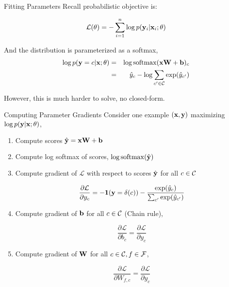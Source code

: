 \documentclass{beamer}
\begin{document}
\begin{frame}{Fitting Parameters}
  Recall probabilistic objective is:

  \[ \mathcal{L}(\theta) = - \sum_{i=1}^n \log p(\mathbf{y}_i | \mathbf{x}_i; \theta) \] 

  And the distribution is parameterized as a softmax,
  \begin{eqnarray*}
   \log p(\boldy=c | \boldx; \theta) &=& \log \softmax(\boldx \boldW  + \boldb)_c \\
    &=&\hat{y}_c - \log \sum_{c' \in \mcC} \exp(\hat{y}_{c'}) 
  \end{eqnarray*}

  However, this is much harder to solve, no closed-form.

  
\end{frame}


\begin{frame}{Computing Parameter Gradients}
  Consider one example $(\mathbf{x}, \mathbf{y})$ maximizing $\log p(\mathbf{y} | \mathbf{x}; \theta)$, 

  \begin{enumerate}
  \item Compute scores $\hat{\mathbf{y}} =  \mathbf{x} \mathbf{W} + \mathbf{b}$  
  \item Compute log softmax of scores, $\log \softmax(\hat{\boldy})$  
  \item Compute gradient of $\mathcal{L}$ with respect to scores $\hat{\mathbf{y}}$ for all $c \in \mathcal{C}$ 

  \[\frac{\partial \mathcal{L} }{\partial y_{c}} = -\mathbf{1}(\mathbf{y} = \delta(c)) - \frac{\exp(\hat{y}_c)}{\sum_{c'} \exp(\hat{y}_{c'}) }  \]
    
  \item Compute gradient of $\mathbf{b}$ for all $c\in \mathcal{C}$ (Chain rule), 

  \[\frac{\partial \mathcal{L}}{\partial b_c} = 
    \frac{\partial \mathcal{L}}{\partial y_c}\]

  \item Compute gradient of $\mathbf{W}$ for all $c\in \mathcal{C}, f \in \mathcal{F}$, 

  \[\frac{\partial \mathcal{L}}{\partial W_{f, c}} = 
     \frac{\partial \mathcal{L}}{\partial y_c}\]

  \end{enumerate}
  
  
\end{frame}
\end{document}
